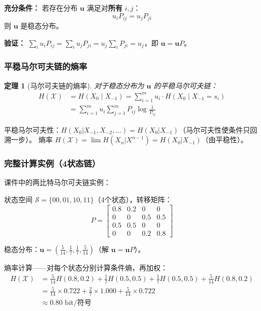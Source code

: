 \documentclass[12pt,a4paper]{ctexart}
\newtheorem{theorem}{定理}[section]
\theoremstyle{definition}
\newcommand{\XX}{\mathcal{X}}
\begin{document}
\begin{keybox}
\textbf{充分条件：} 若存在分布 $\mathbf{u}$ 满足对\textbf{所有} $i,j$：
\[
u_i P_{ij} = u_j P_{ji}
\]
则 $\mathbf{u}$ 是稳态分布。

\textbf{验证：} $\sum_i u_i P_{ij} = \sum_i u_j P_{ji} = u_j \sum_i P_{ji} = u_j$，即 $\mathbf{u} = \mathbf{u}P$。
\end{keybox}

\subsubsection{平稳马尔可夫链的熵率}

\begin{theorem}[马尔可夫链的熵率]
对于稳态分布为 $\mathbf{u}$ 的平稳马尔可夫链：
\begin{align*}
H(\XX) &= H(X_0 \mid X_{-1})
        = \sum_{i=1}^{m} u_i \cdot H(X_0 \mid X_{-1}=s_i) \\
       &= \sum_{i=1}^{m} u_i \sum_{j=1}^{m} P_{ij} \log\frac{1}{P_{ij}}
\end{align*}
\end{theorem}

\begin{proofbox}
平稳马尔可夫性：$H(X_0|X_{-1},X_{-2},\ldots) = H(X_0|X_{-1})$（马尔可夫性使条件只回溯一步）。
熵率 $H(\XX) = \lim H(X_n|X^{n-1}) = H(X_0|X_{-1})$（由平稳性）。
\end{proofbox}

\subsubsection{完整计算实例（4状态链）}

课件中的两比特马尔可夫链实例：

状态空间 $\mathcal{S} = \{00, 01, 10, 11\}$（4个状态），转移矩阵：
\[
P = \begin{bmatrix}
0.8 & 0.2 & 0   & 0   \\
0   & 0   & 0.5 & 0.5 \\
0.5 & 0.5 & 0   & 0   \\
0   & 0   & 0.2 & 0.8
\end{bmatrix}
\]

稳态分布：$\mathbf{u} = (\frac{5}{14}, \frac{1}{7}, \frac{1}{7}, \frac{5}{14})$（解 $\mathbf{u}=\mathbf{u}P$）。

熵率计算——对每个状态分别计算条件熵，再加权：
\begin{align*}
H(\XX) &= \frac{5}{14}H(0.8,0.2) + \frac{1}{7}H(0.5,0.5)
        + \frac{1}{7}H(0.5,0.5) + \frac{5}{14}H(0.8,0.2) \\
       &= \frac{5}{14}\times 0.722 + \frac{2}{7}\times 1.000 + \frac{5}{14}\times 0.722 \\
       &\approx 0.80 \text{ bit/符号}
\end{align*}
\end{document}

